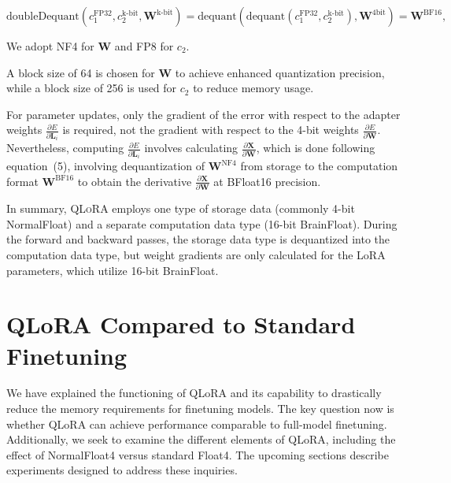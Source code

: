 \begin{equation}
    \text{doubleDequant}(c_1^{\text{FP32}}, c_2^{\text{k-bit}}, \mathbf{W}^{\text{k-bit}}) = \text{dequant}(\text{dequant}(c_1^{\text{FP32}}, c_2^{\text{k-bit}}), \mathbf{W}^{\text{4bit}}) = \mathbf{W}^{\text{BF16}},
\end{equation}

We adopt NF4 for $\mathbf{W}$ and FP8 for $c_2$.

A block size of 64 is chosen for $\mathbf{W}$ to achieve enhanced quantization precision, while a block size of 256 is used for $c_2$ to reduce memory usage.

For parameter updates, only the gradient of the error with respect to the adapter weights $\frac{\partial E}{\partial \mathbf{L}_i}$ is required, not the gradient with respect to the 4-bit weights $\frac{\partial E}{\partial \mathbf{W}}$. Nevertheless, computing $\frac{\partial E}{\partial \mathbf{L}_i}$ involves calculating $\frac{\partial \mathbf{X}}{\partial \mathbf{W}}$, which is done following equation~(5), involving dequantization of $\mathbf{W}^{\text{NF4}}$ from storage to the computation format $\mathbf{W}^{\text{BF16}}$ to obtain the derivative $\frac{\partial \mathbf{X}}{\partial \mathbf{W}}$ at BFloat16 precision.

In summary, \textsc{QLoRA} employs one type of storage data (commonly 4-bit NormalFloat) and a separate computation data type (16-bit BrainFloat). During the forward and backward passes, the storage data type is dequantized into the computation data type, but weight gradients are only calculated for the LoRA parameters, which utilize 16-bit BrainFloat.

\section{QLoRA Compared to Standard Finetuning}
\label{sec:comp_to_std}

We have explained the functioning of QLoRA and its capability to drastically reduce the memory requirements for finetuning models. The key question now is whether QLoRA can achieve performance comparable to full-model finetuning. Additionally, we seek to examine the different elements of QLoRA, including the effect of NormalFloat4 versus standard Float4. The upcoming sections describe experiments designed to address these inquiries.

